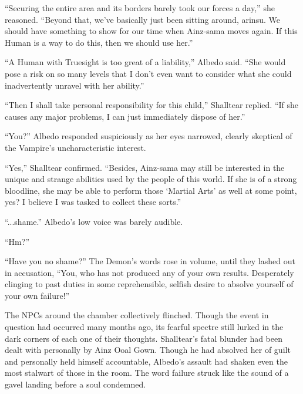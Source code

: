  

“Securing the entire area and its borders barely took our forces a day,” she reasoned. “Beyond that, we’ve basically just been sitting around, arinsu. We should have something to show for our time when Ainz-sama moves again. If this Human is a way to do this, then we should use her.”

 

“A Human with Truesight is too great of a liability,” Albedo said. “She would pose a risk on so many levels that I don’t even want to consider what she could inadvertently unravel with her ability.”

 

“Then I shall take personal responsibility for this child,” Shalltear replied. “If she causes any major problems, I can just immediately dispose of her.”

 

“You?” Albedo responded suspiciously as her eyes narrowed, clearly skeptical of the Vampire’s uncharacteristic interest.

 

“Yes,” Shalltear confirmed. “Besides, Ainz-sama may still be interested in the unique and strange abilities used by the people of this world. If she is of a strong bloodline, she may be able to perform those ‘Martial Arts’ as well at some point, yes? I believe I was tasked to collect these sorts.”

 

“...shame.” Albedo’s low voice was barely audible.

 

“Hm?”

 

“Have you no shame?” The Demon’s words rose in volume, until they lashed out in accusation, “You, who has not produced any of your own results. Desperately clinging to past duties in some reprehensible, selfish desire to absolve yourself of your own failure!”

 

The NPCs around the chamber collectively flinched. Though the event in question had occurred many months ago, its fearful spectre still lurked in the dark corners of each one of their thoughts. Shalltear’s fatal blunder had been dealt with personally by Ainz Ooal Gown. Though he had absolved her of guilt and personally held himself accountable, Albedo’s assault had shaken even the most stalwart of those in the room. The word failure struck like the sound of a gavel landing before a soul condemned.


